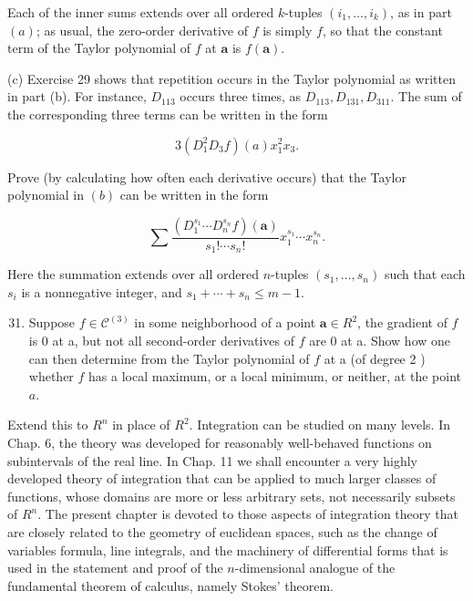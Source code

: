 \documentclass[10pt]{article}
\begin{document}
Each of the inner sums extends over all ordered $k$-tuples $\left(i_{1}, \ldots, i_{k}\right)$, as in part $(a)$; as usual, the zero-order derivative of $f$ is simply $f$, so that the constant term of the Taylor polynomial of $f$ at $\mathbf{a}$ is $f(\mathbf{a})$.

(c) Exercise 29 shows that repetition occurs in the Taylor polynomial as written in part (b). For instance, $D_{113}$ occurs three times, as $D_{113}, D_{131}, D_{311}$. The sum of the corresponding three terms can be written in the form

$$
3\left(D_{1}^{2} D_{3} f\right)(a) x_{1}^{2} x_{3} .
$$

Prove (by calculating how often each derivative occurs) that the Taylor polynomial in $(b)$ can be written in the form

$$
\sum \frac{\left(D_{1}^{s_{1}} \cdots D_{n}^{s_{n}} f\right)(\mathbf{a})}{s_{1} ! \cdots s_{n} !} x_{1}^{s_{1}} \cdots x_{n}^{s_{n}} .
$$

Here the summation extends over all ordered $n$-tuples $\left(s_{1}, \ldots, s_{n}\right)$ such that each $s_{i}$ is a nonnegative integer, and $s_{1}+\cdots+s_{n} \leq m-1$.

\begin{enumerate}
  \setcounter{enumi}{30}
  \item Suppose $f \in \mathscr{C}^{(3)}$ in some neighborhood of a point $\mathbf{a} \in R^{2}$, the gradient of $f$ is 0 at a, but not all second-order derivatives of $f$ are 0 at a. Show how one can then determine from the Taylor polynomial of $f$ at a (of degree 2 ) whether $f$ has a local maximum, or a local minimum, or neither, at the point $a$.
\end{enumerate}

Extend this to $R^{n}$ in place of $R^{2}$. Integration can be studied on many levels. In Chap. 6, the theory was developed for reasonably well-behaved functions on subintervals of the real line. In Chap. 11 we shall encounter a very highly developed theory of integration that can be applied to much larger classes of functions, whose domains are more or less arbitrary sets, not necessarily subsets of $R^{n}$. The present chapter is devoted to those aspects of integration theory that are closely related to the geometry of euclidean spaces, such as the change of variables formula, line integrals, and the machinery of differential forms that is used in the statement and proof of the $n$-dimensional analogue of the fundamental theorem of calculus, namely Stokes' theorem.
\end{document}
